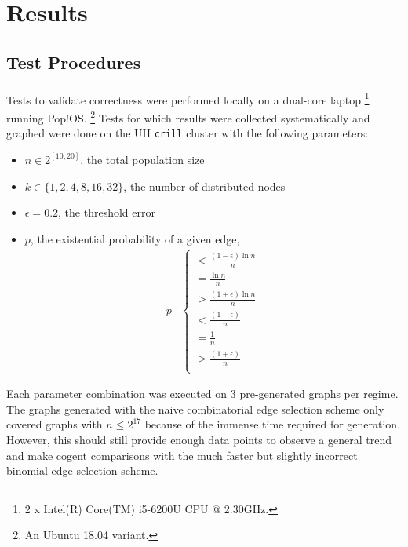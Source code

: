 \documentclass[11pt,epsf]{article}
\begin{document}
\section{Results}{
  \subsection{Test Procedures}{
    \paragraph{}{
      Tests to validate correctness were performed locally on a dual-core laptop
      \footnote{2 x Intel(R) Core(TM) i5-6200U CPU @ 2.30GHz.} running Pop!OS.
      \footnote{An Ubuntu 18.04 variant.}
      Tests for which results were collected systematically and graphed were
      done on the UH \texttt{crill} cluster with the following parameters:
      \begin{itemize}
      \item{$n \in 2^{[10,20]}$, the total population size}
      \item{$k \in \{1,2,4,8,16,32\}$, the number of distributed nodes}
      \item{$\epsilon = 0.2$, the threshold error}
      \item{$p$, the existential probability of a given edge,
        \begin{align}
          p &
          \begin{cases}
            < \frac{(1 - \epsilon)\ln n}{n} \\
            = \frac{\ln n}{n} \\
            > \frac{(1 + \epsilon)\ln n}{n} \\
            < \frac{(1 - \epsilon)}{n} \\
            = \frac{1}{n} \\
            > \frac{(1 + \epsilon)}{n} \\
          \end{cases}
        \end{align}
      }
      \end{itemize}
      Each parameter combination was executed on 3 pre-generated graphs
      per regime. The graphs generated with the naive combinatorial edge
      selection scheme only covered graphs with $n \leq 2^{17}$ because of
      the immense time required for generation. However, this should still
      provide enough data points to observe a general trend and make cogent
      comparisons with the much faster but slightly incorrect binomial edge
      selection scheme.
    }
}}
\end{document}
